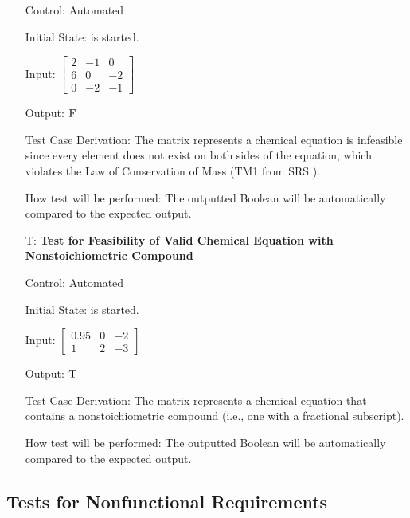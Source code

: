 \documentclass[12pt, titlepage]{article}
\newcounter{testnum} %
\begin{document}
\begin{enumerate}
    Control: Automated

    Initial State: \progname{} is started.

    Input: $\begin{bmatrix}
        2 & -1 & 0  \\
        6 & 0  & -2 \\
        0 & -2 & -1
      \end{bmatrix}$

    Output: $\textsc{F}$

    Test Case Derivation: The matrix represents a chemical equation is
    infeasible since
    every element does not exist on both sides of the equation, which violates
    the Law of Conservation of Mass (TM1 from SRS ).

    How test will be performed: The outputted Boolean will be automatically
    compared to the expected output.

  \item[T\refstepcounter{testnum}\thetestnum \label{test_nonstoich_valid_feas}:]
    \textbf{Test for Feasibility of Valid Chemical Equation with
      Nonstoichiometric Compound}

    Control: Automated

    Initial State: \progname{} is started.

    Input:
    $\begin{bmatrix}
        0.95 & 0 & -2 \\
        1    & 2 & -3
      \end{bmatrix}$

    Output: $\textsc{T}$

    Test Case Derivation: The matrix represents a chemical equation that
    contains a nonstoichiometric compound (i.e., one with a fractional
    subscript).

    How test will be performed: The outputted Boolean will be automatically
    compared to the expected output.

\end{enumerate}

\subsection{Tests for Nonfunctional Requirements}

\end{document}
